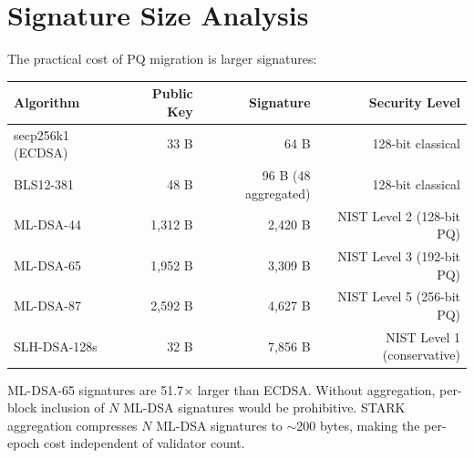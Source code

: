 \section{Signature Size Analysis}


The practical cost of PQ migration is larger signatures:

\begin{center}
\begin{tabular}{lrrr}
\toprule
\textbf{Algorithm} & \textbf{Public Key} & \textbf{Signature} & \textbf{Security Level} \\
\midrule
secp256k1 (ECDSA) & 33 B & 64 B & 128-bit classical \\
BLS12-381 & 48 B & 96 B (48 aggregated) & 128-bit classical \\
ML-DSA-44 & 1,312 B & 2,420 B & NIST Level 2 (128-bit PQ) \\
ML-DSA-65 & 1,952 B & 3,309 B & NIST Level 3 (192-bit PQ) \\
ML-DSA-87 & 2,592 B & 4,627 B & NIST Level 5 (256-bit PQ) \\
SLH-DSA-128s & 32 B & 7,856 B & NIST Level 1 (conservative) \\
\bottomrule
\end{tabular}
\end{center}

ML-DSA-65 signatures are 51.7$\times$ larger than ECDSA. Without aggregation, per-block inclusion of $N$ ML-DSA signatures would be prohibitive. STARK aggregation compresses $N$ ML-DSA signatures to $\sim$200 bytes, making the per-epoch cost independent of validator count.

